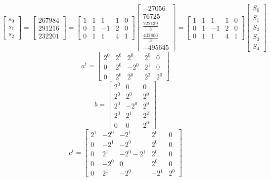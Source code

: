 \documentclass{article}%
\begin{document}
\[%
\left[\begin{matrix}s_{0}\\s_{1}\\s_{2}\end{matrix}\right] = \left[\begin{matrix}267984\\291216\\232201\end{matrix}\right] = \left[\begin{matrix}1 & 1 & 1 & 1 & 0\\0 & 1 & -1 & 2 & 0\\0 & 1 & 1 & 4 & 1\end{matrix}\right] \left[\begin{matrix}-27056\\76725\\\frac{222139}{3}\\\frac{432806}{3}\\-495645\end{matrix}\right] = \left[\begin{matrix}1 & 1 & 1 & 1 & 0\\0 & 1 & -1 & 2 & 0\\0 & 1 & 1 & 4 & 1\end{matrix}\right] \left[\begin{matrix}S_{0}\\S_{1}\\S_{2}\\S_{3}\\S_{4}\end{matrix}\right]%
\]%
\[%
a^{t} = \left[\begin{matrix}2^{0} & 2^{0} & 2^{0} & 2^{0} & 0\\0 & 2^{0} & - 2^{0} & 2^{1} & 0\\0 & 2^{0} & 2^{0} & 2^{2} & 2^{0}\end{matrix}\right]%
\]%
\[%
b = \left[\begin{matrix}2^{0} & 0 & 0\\2^{0} & 2^{0} & 2^{0}\\2^{0} & - 2^{0} & 2^{0}\\2^{0} & 2^{1} & 2^{2}\\0 & 0 & 2^{0}\end{matrix}\right]%
\]%
\[%
c^{t} = \left[\begin{matrix}2^{1} & - 2^{0} & - 2^{1} & 2^{0} & 0\\0 & - 2^{1} & - 2^{0} & 2^{0} & 0\\0 & 2^{1} & - 2^{0} - 2^{1} & 2^{0} & 0\\0 & - 2^{0} & 0 & 2^{0} & 0\\0 & 2^{1} & - 2^{0} & - 2^{1} & 2^{0}\end{matrix}\right]%
\]%
\end{document}
